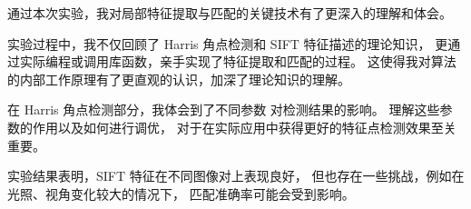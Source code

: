 通过本次实验，我对局部特征提取与匹配的关键技术有了更深入的理解和体会。

实验过程中，我不仅回顾了 Harris 角点检测和 SIFT 特征描述的理论知识，
更通过实际编程或调用库函数，亲手实现了特征提取和匹配的过程。
这使得我对算法的内部工作原理有了更直观的认识，加深了理论知识的理解。

在 Harris 角点检测部分，我体会到了不同参数
对检测结果的影响。
理解这些参数的作用以及如何进行调优，
对于在实际应用中获得更好的特征点检测效果至关重要。

实验结果表明，SIFT 特征在不同图像对上表现良好，
但也存在一些挑战，例如在光照、视角变化较大的情况下，
匹配准确率可能会受到影响。